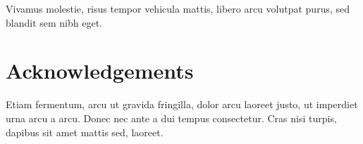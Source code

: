 \documentclass[a0,portrait]{a0poster}
\begin{document}
\begin{multicols}{2}
Vivamus molestie, risus tempor vehicula mattis, libero arcu volutpat purus, sed blandit sem nibh eget.

\normalsize




\section*{Acknowledgements}

Etiam fermentum, arcu ut gravida fringilla, dolor arcu laoreet justo, ut imperdiet urna arcu a arcu. Donec nec ante a dui tempus consectetur. Cras nisi turpis, dapibus sit amet mattis sed, laoreet.


\end{multicols}
\end{document}
